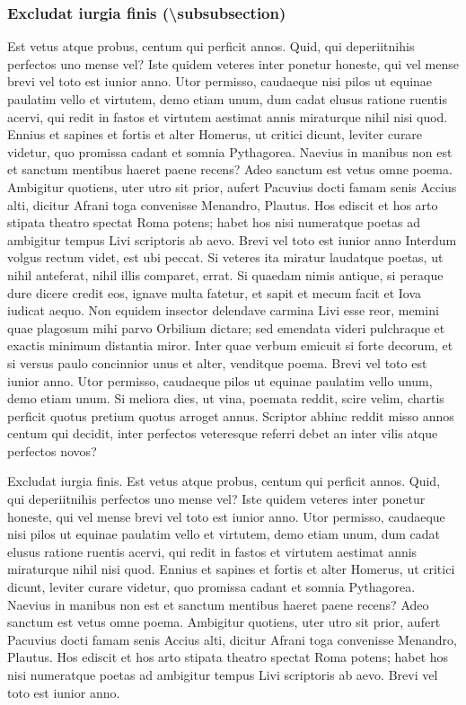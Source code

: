 \documentclass[article,colorback,accentcolor=tud4c]{tudreport}
\begin{document}
  \subsubsection{Excludat iurgia finis (\textbackslash subsubsection)}

    Est vetus atque probus, centum qui perficit annos. Quid, qui deperiitnihis perfectos uno mense vel? Iste quidem veteres inter ponetur honeste, qui vel mense brevi vel toto est iunior anno. Utor permisso, caudaeque nisi pilos ut equinae paulatim vello et virtutem, demo etiam unum, dum cadat elusus ratione ruentis acervi, qui redit in fastos et virtutem aestimat annis miraturque nihil nisi quod. Ennius et sapines et fortis et alter Homerus, ut critici dicunt, leviter curare videtur, quo promissa cadant et somnia Pythagorea.  Naevius in manibus non est et sanctum mentibus haeret paene recens?  Adeo sanctum est vetus omne poema.
    Ambigitur quotiens, uter utro sit prior, aufert Pacuvius docti famam senis Accius alti, dicitur Afrani toga convenisse Menandro, Plautus. Hos ediscit et hos arto stipata theatro spectat Roma potens; habet hos nisi numeratque poetas ad ambigitur tempus Livi scriptoris ab aevo.
    Brevi vel toto est iunior anno
    Interdum volgus rectum videt, est ubi peccat. Si veteres ita miratur laudatque poetas, ut nihil anteferat, nihil illis comparet, errat.  Si quaedam nimis antique, si peraque dure dicere credit eos, ignave multa fatetur, et sapit et mecum facit et Iova iudicat aequo. Non equidem insector delendave carmina Livi esse reor, memini quae plagosum mihi parvo Orbilium dictare; sed emendata videri pulchraque et exactis minimum distantia miror. Inter quae verbum emicuit si forte decorum, et si versus paulo concinnior unus et alter, venditque poema. Brevi vel toto est iunior anno. Utor permisso, caudaeque pilos ut equinae paulatim vello unum, demo etiam unum. Si meliora dies, ut vina, poemata reddit, scire velim, chartis perficit quotus pretium quotus arroget annus. Scriptor abhinc reddit misso annos centum qui decidit, inter perfectos veteresque referri debet an inter vilis atque perfectos novos?

    Excludat iurgia finis. Est vetus atque probus, centum qui perficit annos. Quid, qui deperiitnihis perfectos uno mense vel? Iste quidem veteres inter ponetur honeste, qui vel mense brevi vel toto est iunior anno. Utor permisso, caudaeque nisi pilos ut equinae paulatim vello et virtutem, demo etiam unum, dum cadat elusus ratione ruentis acervi, qui redit in fastos et virtutem aestimat annis miraturque nihil nisi quod. Ennius et sapines et fortis et alter Homerus, ut critici dicunt, leviter curare videtur, quo promissa cadant et somnia Pythagorea.
    Naevius in manibus non est et sanctum mentibus haeret paene recens?  Adeo sanctum est vetus omne poema. Ambigitur quotiens, uter utro sit prior, aufert Pacuvius docti famam senis Accius alti, dicitur Afrani toga convenisse Menandro, Plautus. Hos ediscit et hos arto stipata theatro spectat Roma potens; habet hos nisi numeratque poetas ad ambigitur tempus Livi scriptoris ab aevo. Brevi vel toto est iunior anno.
\end{document}

